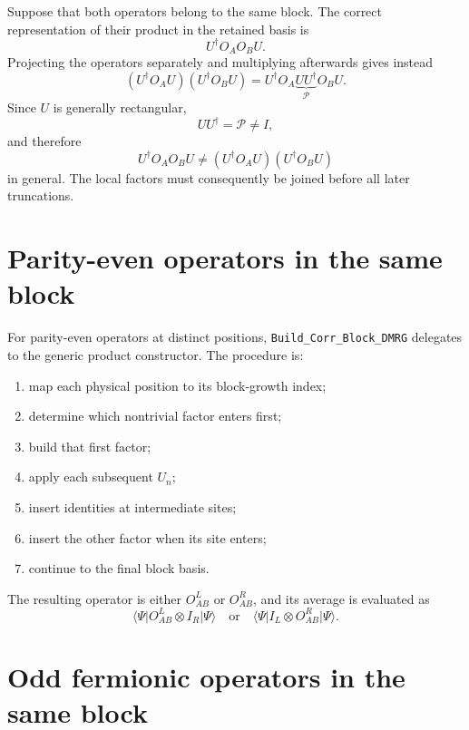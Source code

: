 \documentclass[11pt,a4paper]{article}
\newcommand{\ket}[1]{\lvert #1\rangle}
\newcommand{\bra}[1]{\langle #1\rvert}
\begin{document}
Suppose that both operators belong to the same block.  The correct
representation of their product in the retained basis is
\begin{equation}
  U^\dagger O_AO_BU.
\end{equation}
Projecting the operators separately and multiplying afterwards gives instead
\begin{equation}
  (U^\dagger O_AU)(U^\dagger O_BU)
  =U^\dagger O_A\underbrace{UU^\dagger}_{\mathcal P}O_BU.
\end{equation}
Since $U$ is generally rectangular,
\begin{equation}
  UU^\dagger=\mathcal P\ne I,
\end{equation}
and therefore
\begin{equation}
  U^\dagger O_AO_BU
  \ne
  (U^\dagger O_AU)(U^\dagger O_BU)
\end{equation}
in general.  The local factors must consequently be joined before all later
truncations.

\section{Parity-even operators in the same block}

For parity-even operators at distinct positions,
\texttt{Build\_Corr\_Block\_DMRG} delegates to the generic product
constructor.  The procedure is:
\begin{enumerate}[label=\arabic*.]
  \item map each physical position to its block-growth index;
  \item determine which nontrivial factor enters first;
  \item build that first factor;
  \item apply each subsequent $U_n$;
  \item insert identities at intermediate sites;
  \item insert the other factor when its site enters;
  \item continue to the final block basis.
\end{enumerate}

The resulting operator is either $O_{AB}^L$ or $O_{AB}^R$, and its average is
evaluated as
\begin{equation}
  \bra{\Psi}O_{AB}^L\otimes I_R\ket{\Psi}
  \quad\text{or}\quad
  \bra{\Psi}I_L\otimes O_{AB}^R\ket{\Psi}.
\end{equation}

\section{Odd fermionic operators in the same block}
\end{document}
